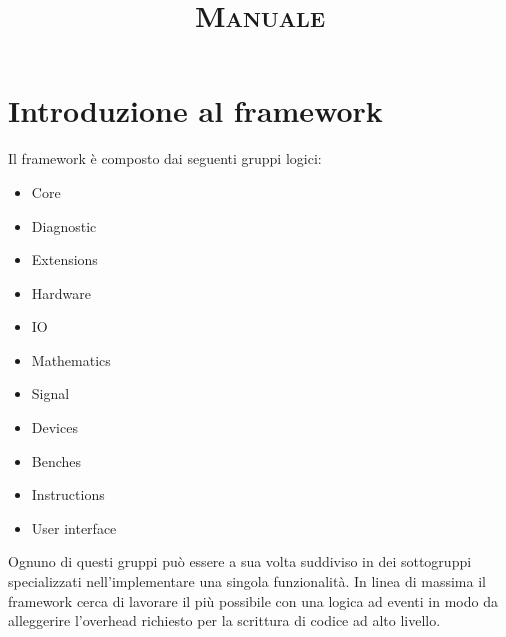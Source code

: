 \documentclass{article}
\begin{document}
	\title{
		\begin{titlepage}
			\centering
			
			{\huge\bfseries \textsc{Manuale} \par}
			\vspace{2cm}					
		\end{titlepage}
	}

	\maketitle
	
	
	\tableofcontents
	\newpage
	
	\listoffigures
	\newpage
	
	\listoftables
	\newpage
	
	
	\maketitle
	\newpage
	
	\section{Introduzione al framework} \label{section:Introduzione}
		Il framework è composto dai seguenti gruppi logici:
		
		\begin{itemize}
			\item Core
			\item Diagnostic
			\item Extensions
			\item Hardware
			\item IO
			\item Mathematics
			\item Signal
			\item Devices
			\item Benches
			\item Instructions
			\item User interface
		\end{itemize}
		
		Ognuno di questi gruppi può essere a sua volta suddiviso in dei sottogruppi specializzati nell'implementare una singola funzionalità. In linea di massima il framework cerca di lavorare il più possibile con una logica ad eventi in modo da alleggerire l'overhead richiesto per la scrittura di codice ad alto livello.
		
\end{document}
